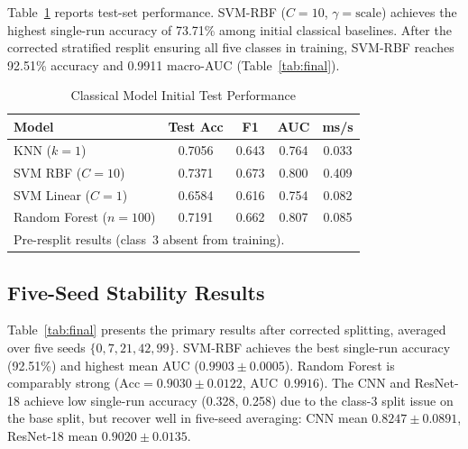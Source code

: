 \documentclass[conference]{IEEEtran}
\begin{document}
Table~\ref{tab:classical} reports test-set performance.
SVM-RBF ($C=10$, $\gamma=\text{scale}$) achieves the highest single-run
accuracy of 73.71\% among initial classical baselines. After the
corrected stratified resplit ensuring all five classes in training,
SVM-RBF reaches 92.51\% accuracy and 0.9911 macro-AUC
(Table~\ref{tab:final}).

\begin{table}[t]
  \caption{Classical Model Initial Test Performance}
  \label{tab:classical}
  \centering
  \setlength{\tabcolsep}{3pt}
  \begin{tabular}{lcccc}
    \toprule
    \textbf{Model} & \textbf{Test Acc} & \textbf{F1} & \textbf{AUC} & \textbf{ms/s} \\
    \midrule
    KNN ($k=1$)          & 0.7056 & 0.643 & 0.764 & 0.033 \\
    SVM RBF ($C=10$)     & 0.7371 & 0.673 & 0.800 & 0.409 \\
    SVM Linear ($C=1$)   & 0.6584 & 0.616 & 0.754 & 0.082 \\
    Random Forest ($n=100$) & 0.7191 & 0.662 & 0.807 & 0.085 \\
    \bottomrule
    \multicolumn{5}{l}{\small Pre-resplit results (class~3 absent from training).}
  \end{tabular}
\end{table}

\subsection{Five-Seed Stability Results}

Table~\ref{tab:final} presents the primary results after corrected
splitting, averaged over five seeds $\{0,7,21,42,99\}$.
SVM-RBF achieves the best single-run accuracy (92.51\%) and highest
mean AUC ($0.9903\pm0.0005$). Random Forest is comparably strong
($\text{Acc}=0.9030\pm0.0122$, AUC~$0.9916$). The CNN and ResNet-18
achieve low single-run accuracy (0.328, 0.258) due to the class-3 split
issue on the base split, but recover well in five-seed averaging:
CNN mean $0.8247\pm0.0891$, ResNet-18 mean $0.9020\pm0.0135$.
\end{document}
